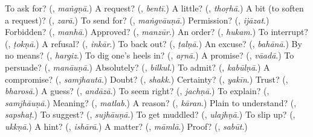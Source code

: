 \begin{tcolorbox}[breakable,colback=teal!4,colframe=teal!35!black,title={Before you move on}]
To ask for? (\textbf{}, \emph{maṅgṇā}.) A request? (\textbf{}, \emph{bentī}.) A little? (\textbf{}, \emph{thoṛhā}.) A bit (to soften a request)? (\textbf{}, \emph{zarā}.) To send for? (\textbf{}, \emph{maṅgvāuṇā}.) Permission? (\textbf{}, \emph{ijāzat}.) Forbidden? (\textbf{}, \emph{manhā}.) Approved? (\textbf{}, \emph{manzūr}.) An order? (\textbf{}, \emph{hukam}.) To interrupt? (\textbf{}, \emph{ṭokṇā}.) A refusal? (\textbf{}, \emph{inkār}.) To back out? (\textbf{}, \emph{ṭalṇā}.) An excuse? (\textbf{}, \emph{bahānā}.) By no means? (\textbf{}, \emph{hargiz}.) To dig one's heels in? (\textbf{}, \emph{aṛnā}.) A promise? (\textbf{}, \emph{vāadā}.) To persuade? (\textbf{}, \emph{manāuṇā}.) Absolutely? (\textbf{}, \emph{bilkul}.) To admit? (\textbf{}, \emph{kabūlṇā}.) A compromise? (\textbf{}, \emph{samjhautā}.) Doubt? (\textbf{}, \emph{shakk}.) Certainty? (\textbf{}, \emph{yakīn}.) Trust? (\textbf{}, \emph{bharosā}.) A guess? (\textbf{}, \emph{andāzā}.) To seem right? (\textbf{}, \emph{jachṇā}.) To explain? (\textbf{}, \emph{samjhāuṇā}.) Meaning? (\textbf{}, \emph{matlab}.) A reason? (\textbf{}, \emph{kāran}.) Plain to understand? (\textbf{}, \emph{sapshaṭ}.) To suggest? (\textbf{}, \emph{sujhāuṇā}.) To get muddled? (\textbf{}, \emph{ulajhṇā}.) To slip up? (\textbf{}, \emph{ukkṇā}.) A hint? (\textbf{}, \emph{ishārā}.) A matter? (\textbf{}, \emph{māmlā}.) Proof? (\textbf{}, \emph{sabūt}.)
\end{tcolorbox}
